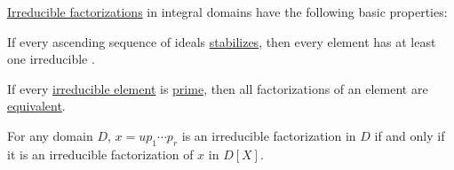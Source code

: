 \begin{proposition}\label{thm:def:irreducible_factorization}
  \hyperref[def:irreducible_factorization]{Irreducible factorizations} in integral domains have the following basic properties:
  \begin{thmenum}
     If every ascending sequence of  ideals \hyperref[def:stabilizing_sequence]{stabilizes}, then every element has at least one irreducible .

     If every \hyperref[def:domain_divisibility/irreducible]{irreducible element} is \hyperref[def:domain_divisibility/prime]{prime}, then all factorizations of an element are \hyperref[def:irreducible_factorization/equivalent]{equivalent}.

     For any domain \( D \), \( x = u p_1 \cdots p_r \) is an irreducible factorization in \( D \) if and only if it is an irreducible factorization of \( x \) in \( D[X] \).
  \end{thmenum}
\end{proposition}
